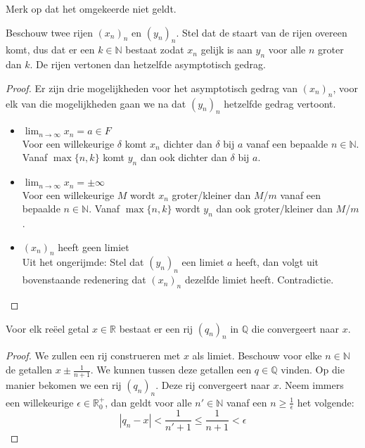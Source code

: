\documentclass[main.tex]{subfiles}
\begin{document}
\begin{opm}
  Merk op dat het omgekeerde niet geldt.
\end{opm}

\begin{pr}
  Beschouw twee rijen $(x_{n})_{n}$ en $(y_{n})_{n}$.
  Stel dat de staart van de rijen overeen komt, dus dat er een $k\in \mathbb{N}$ bestaat zodat $x_{n}$ gelijk is aan $y_{n}$ voor alle $n$ groter dan $k$.
  De rijen vertonen dan hetzelfde asymptotisch gedrag.
  \begin{proof}
    Er zijn drie mogelijkheden voor het asymptotisch gedrag van $(x_{n})_{n}$, voor elk van die mogelijkheden gaan we na dat $(y_{n})_{n}$ hetzelfde gedrag vertoont.
    \begin{itemize}
    \item $\lim_{n \rightarrow \infty}x_{n} = a\in F$\\
      Voor een willekeurige $\delta$ komt $x_{n}$ dichter dan $\delta$ bij $a$ vanaf een bepaalde $n\in \mathbb{N}$.
      Vanaf $\max\{n,k\}$ komt $y_{n}$ dan ook dichter dan $\delta$ bij $a$.
    \item $\lim_{n \rightarrow \infty}x_{n} = \pm \infty$\\
      Voor een willekeurige $M$ wordt $x_{n}$ groter/kleiner dan $M$/$m$ vanaf een bepaalde $n\in \mathbb{N}$.
      Vanaf $\max\{n,k\}$ wordt $y_{n}$ dan ook groter/kleiner dan $M$/$m$.
    \item $(x_{n})_{n}$ heeft geen limiet\\
      Uit het ongerijmde:
      Stel dat $(y_{n})_{n}$ een limiet $a$ heeft, dan volgt uit bovenstaande redenering dat $(x_{n})_{n}$ dezelfde limiet heeft.
      Contradictie.
    \end{itemize}
  \end{proof}

\end{pr}

\begin{pr}
  Voor elk re\"eel getal $x\in \mathbb{R}$ bestaat er een rij $(q_{n})_{n}$ in $\mathbb{Q}$ die convergeert naar $x$.

  \begin{proof}
    We zullen een rij construeren met $x$ als limiet.
    Beschouw voor elke $n\in \mathbb{N}$ de getallen $x\pm \frac{1}{n+1}$.
    We kunnen tussen deze getallen een $q\in \mathbb{Q}$ vinden.
    Op die manier bekomen we een rij $(q_{n})_{n}$.
    Deze rij convergeert naar $x$.
    Neem immers een willekeurige $\epsilon \in \mathbb{R}_{0}^{+}$, dan geldt voor alle $n'\in\mathbb{N}$ vanaf een $n \ge \frac{1}{\epsilon}$ het volgende:
    \[ |q_{n}-x| < \frac{1}{n'+1} \le \frac{1}{n+1} < \epsilon \]
  \end{proof}
\end{pr}
\end{document}
